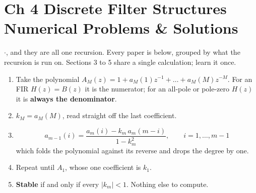 \section*{\color{acc}Ch 4 \textperiodcentered{} Discrete Filter Structures\\[2pt]
{\large\textcolor{sub}{Numerical Problems \& Solutions}}}
\vspace{-4pt}{\color{acc}\rule{\textwidth}{1.1pt}}\vspace{4pt}

{\color{sub}\footnotesize {} \gap$\cdot$\gap {}, and they are all
one recursion. Every paper is below, grouped by what the recursion is run on. Sections 3
to 5 share a single calculation; learn it once.}

\begin{enumerate}
  \item Take the polynomial $A_M(z)=1+a_M(1)z^{-1}+\dots+a_M(M)z^{-M}$. For an FIR
        $H(z)=B(z)$ it is the numerator; for an all-pole or pole-zero $H(z)$ it is
        \textbf{always the denominator}.
  \item \textbf{$k_M=a_M(M)$}, read straight off the last coefficient.
  \item \[ a_{m-1}(i)=\frac{a_m(i)-k_m\,a_m(m-i)}{1-k_m^{2}},\qquad i=1,\dots,m-1 \]
        which folds the polynomial against its reverse and drops the degree by one.
  \item Repeat until $A_1$, whose one coefficient is $k_1$.
  \item \textbf{Stable} if and only if every $|k_m|<1$. Nothing else to compute.
\end{enumerate}

